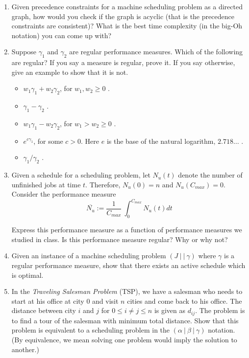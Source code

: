 \documentclass[10pt]{article}
\begin{document}
\MakeScribeTop
\begin{enumerate}
\item Given precedence constraints for a machine scheduling problem as a directed graph, how would you check if the graph is acyclic (that is the precedence constraints are consistent)? What is the best time complexity (in the big-Oh notation) you can come up with?

\item 
Suppose $\gamma_1$ and $\gamma_2$ are regular performance measures. Which of the following are regular? If you say a measure is regular, prove it. If you say otherwise, give an example to show that it is not.
\begin{itemize}
\item $w_1\gamma_1 + w_2\gamma_2$, for $w_1,w_2 \ge 0$ .
\item $\gamma_1 - \gamma_2$ .
\item $w_1\gamma_1 - w_2\gamma_2$, for $w_1 > w_2 \ge 0$ .
\item $e^{c\gamma_1}$, for some $c > 0$. Here $e$ is the base of the natural logarithm, $2.718\ldots$ .
\item $\gamma_1/\gamma_2$ .
\end{itemize}

\item 
Given a schedule for a scheduling problem, let $N_u(t)$ denote the number of unfinished jobs at time $t$. Therefore, $N_u(0) = n$ and $N_u(C_{max}) = 0$. Consider the performance measure
$$\overline{N_u} := \frac{1}{C_{max}} ~\int^{C_{max}}_{0} N_u(t)dt$$

Express this performance measure as a function of performance measures we studied in class. Is this performance measure regular? Why or why not?


\item
Given an instance of a machine scheduling problem $(J ~|~|~ \gamma)$ where $\gamma$ is a regular performance measure, show that there exists an active schedule which is optimal. 

\item 
In the {\em Traveling Salesman Problem} (TSP), we have a salesman who needs to start at his office at city $0$ and visit $n$ cities and come back to his office. The distance between city $i$ and $j$ for $0 \le i\neq j \le n$ is given as $d_{ij}$. The problem is to find a tour of the salesman with minimum total distance. Show that this problem is equivalent to a scheduling problem in the $(\alpha ~|~ \beta ~|~ \gamma)$ notation. (By equivalence, we mean solving one problem would imply the solution to another.)


\end{enumerate}
\end{document}
